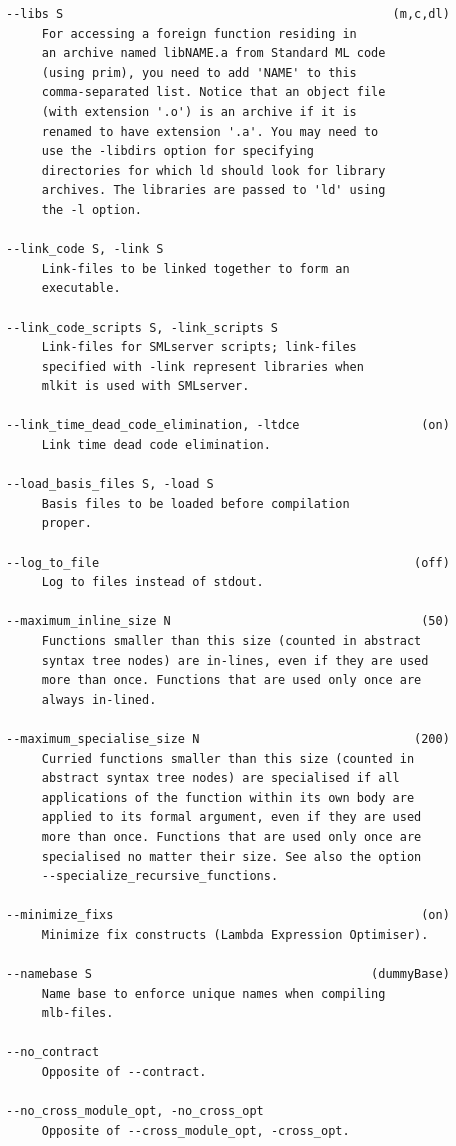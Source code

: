 \documentclass[12pt]{book}
\begin{document}
\begin{verbatim}
--libs S                                              (m,c,dl)
     For accessing a foreign function residing in
     an archive named libNAME.a from Standard ML code
     (using prim), you need to add 'NAME' to this
     comma-separated list. Notice that an object file
     (with extension '.o') is an archive if it is
     renamed to have extension '.a'. You may need to
     use the -libdirs option for specifying
     directories for which ld should look for library
     archives. The libraries are passed to 'ld' using
     the -l option.

--link_code S, -link S 
     Link-files to be linked together to form an
     executable.

--link_code_scripts S, -link_scripts S 
     Link-files for SMLserver scripts; link-files
     specified with -link represent libraries when
     mlkit is used with SMLserver.

--link_time_dead_code_elimination, -ltdce                 (on)
     Link time dead code elimination.

--load_basis_files S, -load S 
     Basis files to be loaded before compilation
     proper.

--log_to_file                                            (off)
     Log to files instead of stdout.

--maximum_inline_size N                                   (50)
     Functions smaller than this size (counted in abstract
     syntax tree nodes) are in-lines, even if they are used
     more than once. Functions that are used only once are
     always in-lined.

--maximum_specialise_size N                              (200)
     Curried functions smaller than this size (counted in
     abstract syntax tree nodes) are specialised if all
     applications of the function within its own body are
     applied to its formal argument, even if they are used
     more than once. Functions that are used only once are
     specialised no matter their size. See also the option
     --specialize_recursive_functions.

--minimize_fixs                                           (on)
     Minimize fix constructs (Lambda Expression Optimiser).

--namebase S                                       (dummyBase)
     Name base to enforce unique names when compiling
     mlb-files.

--no_contract 
     Opposite of --contract.

--no_cross_module_opt, -no_cross_opt 
     Opposite of --cross_module_opt, -cross_opt.


\end{verbatim}
\end{document}
